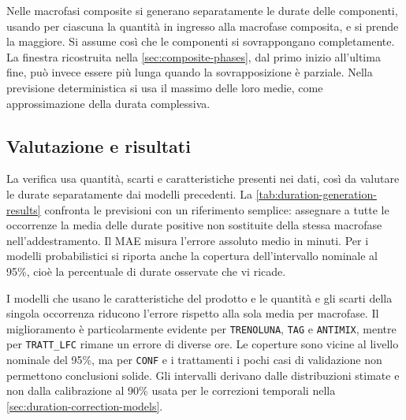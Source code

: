 Nelle macrofasi composite si generano separatamente le durate delle componenti, usando per ciascuna la quantità in ingresso alla macrofase composita, e si prende la maggiore. Si assume così che le componenti si sovrappongano completamente. La finestra ricostruita nella \cref{sec:composite-phases}, dal primo inizio all'ultima fine, può invece essere più lunga quando la sovrapposizione è parziale. Nella previsione deterministica si usa il massimo delle loro medie, come approssimazione della durata complessiva.

\subsection{Valutazione e risultati}
\label{sec:duration-generation-results}

La verifica usa quantità, scarti e caratteristiche presenti nei dati, così da valutare le durate separatamente dai modelli precedenti. La \cref{tab:duration-generation-results} confronta le previsioni con un riferimento semplice: assegnare a tutte le occorrenze la media delle durate positive non sostituite della stessa macrofase nell'addestramento. Il MAE misura l'errore assoluto medio in minuti. Per i modelli probabilistici si riporta anche la copertura dell'intervallo nominale al 95\%, cioè la percentuale di durate osservate che vi ricade.



I modelli che usano le caratteristiche del prodotto e le quantità e gli scarti della singola occorrenza riducono l'errore rispetto alla sola media per macrofase. Il miglioramento è particolarmente evidente per \texttt{TRENOLUNA}, \texttt{TAG} e \texttt{ANTIMIX}, mentre per \texttt{TRATT\_LFC} rimane un errore di diverse ore. Le coperture sono vicine al livello nominale del 95\%, ma per \texttt{CONF} e i trattamenti i pochi casi di validazione non permettono conclusioni solide. Gli intervalli derivano dalle distribuzioni stimate e non dalla calibrazione al 90\% usata per le correzioni temporali nella \cref{sec:duration-correction-models}.

